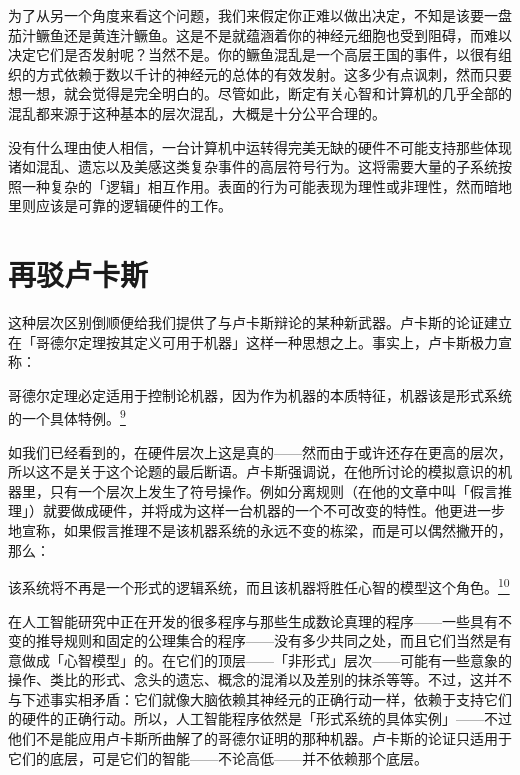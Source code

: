 \documentclass[
  12pt,
  twoside,
  openright,
  oldfontcommands,
]{memoir}
\newenvironment{fsquote}{%
  \begin{mdframed}[style=gebquote]\kaitifamily\small%
}{%
  \end{mdframed}%
}
\begin{document}
为了从另一个角度来看这个问题，我们来假定你正难以做出决定，不知是该要一盘茄汁鳜鱼还是黄连汁鳜鱼。这是不是就蕴涵着你的神经元细胞也受到阻碍，而难以决定它们是否发射呢？当然不是。你的鳜鱼混乱是一个高层王国的事件，以很有组织的方式依赖于数以千计的神经元的总体的有效发射。这多少有点讽刺，然而只要想一想，就会觉得是完全明白的。尽管如此，断定有关心智和计算机的几乎全部的混乱都来源于这种基本的层次混乱，大概是十分公平合理的。

没有什么理由使人相信，一台计算机中运转得完美无缺的硬件不可能支持那些体现诸如混乱、遗忘以及美感这类复杂事件的高层符号行为。这将需要大量的子系统按照一种复杂的「逻辑」相互作用。表面的行为可能表现为理性或非理性，然而暗地里则应该是可靠的逻辑硬件的工作。

\section{再驳卢卡斯}

这种层次区别倒顺便给我们提供了与卢卡斯辩论的某种新武器。卢卡斯的论证建立在「哥德尔定理按其定义可用于机器」这样一种思想之上。事实上，卢卡斯极力宣称：

\begin{fsquote}
哥德尔定理必定适用于控制论机器，因为作为机器的本质特征，机器该是形式系统的一个具体特例。\hyperref[fn:Chapter17-9]{\textsuperscript{9}}
\end{fsquote}

如我们已经看到的，在硬件层次上这是真的------然而由于或许还存在更高的层次，所以这不是关于这个论题的最后断语。卢卡斯强调说，在他所讨论的模拟意识的机器里，只有一个层次上发生了符号操作。例如分离规则（在他的文章中叫「假言推理」）就要做成硬件，并将成为这样一台机器的一个不可改变的特性。他更进一步地宣称，如果假言推理不是该机器系统的永远不变的栋梁，而是可以偶然撇开的，那么：

\begin{fsquote}
该系统将不再是一个形式的逻辑系统，而且该机器将胜任心智的模型这个角色。\hyperref[fn:Chapter17-10]{\textsuperscript{10}}
\end{fsquote}

在人工智能研究中正在开发的很多程序与那些生成数论真理的程序------一些具有不变的推导规则和固定的公理集合的程序------没有多少共同之处，而且它们当然是有意做成「心智模型」的。在它们的顶层------「非形式」层次------可能有一些意象的操作、类比的形式、念头的遗忘、概念的混淆以及差别的抹杀等等。不过，这并不与下述事实相矛盾：它们就像大脑依赖其神经元的正确行动一样，依赖于支持它们的硬件的正确行动。所以，人工智能程序依然是「形式系统的具体实例」------不过他们不是能应用卢卡斯所曲解了的哥德尔证明的那种机器。卢卡斯的论证只适用于它们的底层，可是它们的智能------不论高低------并不依赖那个底层。
\end{document}
